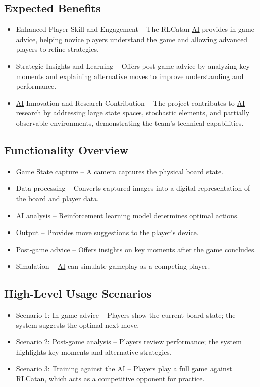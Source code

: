 \documentclass{article}
\newcommand{\AI}{\href{https://en.wikipedia.org/wiki/Artificial_intelligence}{AI}}
\newcommand{\GameState}{\href{https://milvus.io/ai-quick-reference/what-is-a-state-in-rl}{Game State}}
\begin{document}
\subsection{Expected Benefits}\label{subsec:expected-benefits}
\begin{itemize}
    \item {Enhanced Player Skill and Engagement} – The RLCatan \AI{} provides in-game advice, helping novice players understand the game and allowing advanced players to refine strategies.
    \item {Strategic Insights and Learning} – Offers post-game advice by analyzing key moments and explaining alternative moves to improve understanding and performance.
    \item {\AI{} Innovation and Research Contribution} – The project contributes to \AI{} research by addressing large state spaces, stochastic elements, and partially observable environments, demonstrating the team's technical capabilities.
\end{itemize}

\subsection{Functionality Overview}\label{subsec:functionality-overview}
\begin{itemize}
    \item {\GameState{} capture} – A camera captures the physical board state.
    \item {Data processing} – Converts captured images into a digital representation of the board and player data.
    \item {\AI{} analysis} – Reinforcement learning model determines optimal actions.
    \item {Output} – Provides move suggestions to the player's device.
    \item {Post-game advice} – Offers insights on key moments after the game concludes.
    \item {Simulation} – \AI{} can simulate gameplay as a competing player.
\end{itemize}

\subsection{High-Level Usage Scenarios}\label{subsec:high-level-usage-scenarios}
\begin{itemize}
    \item {Scenario 1: In-game advice} – Players show the current board state; the system suggests the optimal next move.
    \item {Scenario 2: Post-game analysis} – Players review performance; the system highlights key moments and alternative strategies.
    \item {Scenario 3: Training against the AI} – Players play a full game against RLCatan, which acts as a competitive opponent for practice.
\end{itemize}
\end{document}
